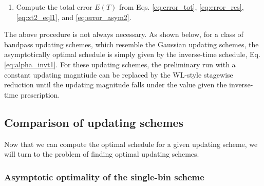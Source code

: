 \documentclass[reprint, superscriptaddress, floatfix]{revtex4-1}
\newcommand{\Err}{E}
\begin{document}
\begin{enumerate}
\item
  Compute the total error $\Err(T)$ from
Eqs. \eqref{eq:error_tot},
  \eqref{eq:error_res},
  \eqref{eq:xt2_eql1},
  and
  \eqref{eq:error_asym2}.

\end{enumerate}

The above procedure is not always necessary.
%
As shown below, for a class of bandpass updating schemes,
  which resemble the Gaussian updating schemes,
  the asymptotically optimal schedule
  is simply given by the inverse-time schedule, Eq. \eqref{eq:alpha_invt1}.
%
For these updating schemes,
  the preliminary run with a constant updating magntiude
  can be replaced by the WL-style stagewise reduction
  until the updating magnitude falls under
  the value given the inverse-time prescription\cite{
    belardinelli2007, *belardinelli2007jcp, *belardinelli2008, *belardinelli2016}.



\subsection{\label{sec:cmpschemes}
Comparison of updating schemes}


Now that we can compute the optimal schedule
for a given updating scheme,
we will turn to the problem of finding
optimal updating schemes.


\subsubsection{\label{sec:optWL}
Asymptotic optimality of the single-bin scheme}
\end{document}
